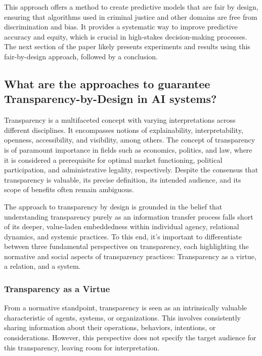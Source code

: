 \documentclass{article}
\begin{document}
This approach offers a method to create predictive models that are fair by design, ensuring that algorithms used in criminal justice and other domains are free from discrimination and bias. It provides a systematic way to improve predictive accuracy and equity, which is crucial in high-stakes decision-making processes. The next section of the paper likely presents experiments and results using this fair-by-design approach, followed by a conclusion.

\newpage
\subsection{What are the approaches to guarantee Transparency-by-Design in AI systems?}

Transparency is a multifaceted concept with varying interpretations across different disciplines.\cite{articletbd} It encompasses notions of explainability, interpretability, openness, accessibility, and visibility, among others. The concept of transparency is of paramount importance in fields such as economics, politics, and law, where it is considered a prerequisite for optimal market functioning, political participation, and administrative legality, respectively. Despite the consensus that transparency is valuable, its precise definition, its intended audience, and its scope of benefits often remain ambiguous.

The approach to transparency by design is grounded in the belief that understanding transparency purely as an information transfer process falls short of its deeper, value-laden embeddedness within individual agency, relational dynamics, and systemic practices. To this end, it's important to differentiate between three fundamental perspectives on transparency, each highlighting the normative and social aspects of transparency practices: Transparency as a virtue, a relation, and a system.

\subsubsection{Transparency as a Virtue}

From a normative standpoint, transparency is seen as an intrinsically valuable characteristic of agents, systems, or organizations. This involves consistently sharing information about their operations, behaviors, intentions, or considerations. However, this perspective does not specify the target audience for this transparency, leaving room for interpretation.
\end{document}
